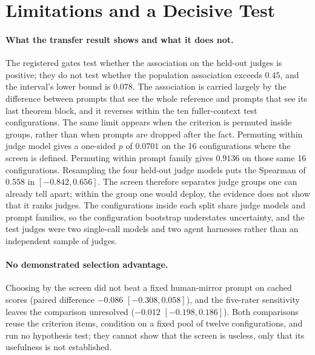 \section{Limitations and a Decisive Test}\label{sec:limitations-test}
\paragraph{What the transfer result shows and what it does not.}
The registered gates test whether the association on the held-out judges is positive; they do not test whether the population association exceeds $0.45$, and the interval's lower bound is $0.078$.
The association is carried largely by the difference between prompts that see the whole reference and prompts that see its last theorem block, and it reverses within the ten fuller-context test configurations.
The same limit appears when the criterion is permuted inside groups, rather than when prompts are dropped after the fact.
Permuting within judge model gives a one-sided $p$ of $0.0701$ on the 16 configurations where the screen is defined.
Permuting within prompt family gives $0.9136$ on those same 16 configurations.
Resampling the four held-out judge models puts the Spearman of $0.558$ in $[-0.842, 0.656]$.
The screen therefore separates judge groups one can already tell apart; within the group one would deploy, the evidence does not show that it ranks judges.
The configurations inside each split share judge models and prompt families, so the configuration bootstrap understates uncertainty, and the test judges were two single-call models and two agent harnesses rather than an independent sample of judges.

\paragraph{No demonstrated selection advantage.}
Choosing by the screen did not beat a fixed human-mirror prompt on cached scores (paired difference $-0.086$ $[-0.308, 0.058]$), and the five-rater sensitivity leaves the comparison unresolved ($-0.012$ $[-0.198, 0.186]$).
Both comparisons reuse the criterion items, condition on a fixed pool of twelve configurations, and run no hypothesis test; they cannot show that the screen is useless, only that its usefulness is not established.

